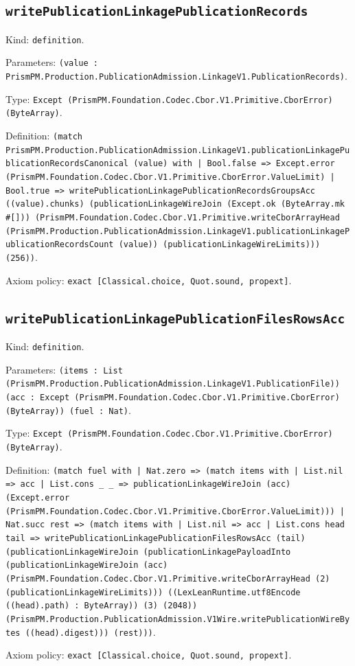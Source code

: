 \documentclass[11pt]{article}
\begin{document}
\subsection*{\texttt{writePublicationLinkagePublicationRecords}}
\noindent Kind: \texttt{definition}.\par
\noindent Parameters: \texttt{(value : PrismPM.Production.PublicationAdmission.LinkageV1.PublicationRecords)}.\par
\noindent Type: \texttt{Except (PrismPM.Foundation.Codec.Cbor.V1.Primitive.CborError) (ByteArray)}.\par
\noindent Definition: \texttt{(match PrismPM.Production.PublicationAdmission.LinkageV1.publicationLinkagePublicationRecordsCanonical (value) with | Bool.false => Except.error (PrismPM.Foundation.Codec.Cbor.V1.Primitive.CborError.ValueLimit) | Bool.true => writePublicationLinkagePublicationRecordsGroupsAcc ((value).chunks) (publicationLinkageWireJoin (Except.ok (ByteArray.mk \#[])) (PrismPM.Foundation.Codec.Cbor.V1.Primitive.writeCborArrayHead (PrismPM.Production.PublicationAdmission.LinkageV1.publicationLinkagePublicationRecordsCount (value)) (publicationLinkageWireLimits))) (256))}.\par
\noindent Axiom policy: \texttt{exact [Classical.choice, Quot.sound, propext]}.\par
\subsection*{\texttt{writePublicationLinkagePublicationFilesRowsAcc}}
\noindent Kind: \texttt{definition}.\par
\noindent Parameters: \texttt{(items : List (PrismPM.Production.PublicationAdmission.LinkageV1.PublicationFile)) (acc : Except (PrismPM.Foundation.Codec.Cbor.V1.Primitive.CborError) (ByteArray)) (fuel : Nat)}.\par
\noindent Type: \texttt{Except (PrismPM.Foundation.Codec.Cbor.V1.Primitive.CborError) (ByteArray)}.\par
\noindent Definition: \texttt{(match fuel with | Nat.zero => (match items with | List.nil => acc | List.cons \_ \_ => publicationLinkageWireJoin (acc) (Except.error (PrismPM.Foundation.Codec.Cbor.V1.Primitive.CborError.ValueLimit))) | Nat.succ rest => (match items with | List.nil => acc | List.cons head tail => writePublicationLinkagePublicationFilesRowsAcc (tail) (publicationLinkageWireJoin (publicationLinkagePayloadInto (publicationLinkageWireJoin (acc) (PrismPM.Foundation.Codec.Cbor.V1.Primitive.writeCborArrayHead (2) (publicationLinkageWireLimits))) ((LexLeanRuntime.utf8Encode ((head).path) : ByteArray)) (3) (2048)) (PrismPM.Production.PublicationAdmission.V1Wire.writePublicationWireBytes ((head).digest))) (rest)))}.\par
\noindent Axiom policy: \texttt{exact [Classical.choice, Quot.sound, propext]}.\par
\end{document}
